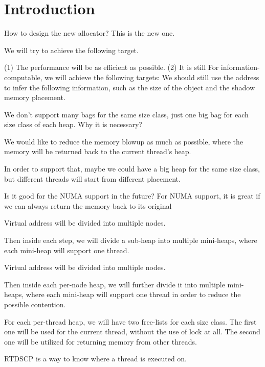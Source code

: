 
\section{Introduction}
\label{sec:intro}

How to design the new allocator? This is the new one. 

We will try to achieve the following target. 

(1) The performance will be as efficient as possible. 
(2) It is still 
For information-computable, we will achieve the following targets:
We should still use the address to infer the following information, such as the size of the object and the shadow memory placement.

We don't support many bags for the same size class, just one big bag for each size class of each heap. Why it is necessary? 

We would like to reduce the memory blowup as much as possible, where the memory will be returned back to the current thread's heap. 

In order to support that, maybe we could have a big heap for the same size class, but different threads will start from different placement. 

Is it good for the NUMA support in the future? For NUMA support, it is great if we can always return the memory back to its original 


Virtual address will be divided into multiple nodes. 

Then inside each step, we will divide a sub-heap into multiple mini-heaps, where each mini-heap will support one thread. 


Virtual address will be divided into multiple nodes. 

Then inside each per-node heap, we will further divide it into multiple mini-heaps, where each mini-heap will support one thread in order to reduce the possible contention. 

For each per-thread heap, we will have two free-lists for each size class. The first one will be used for the current thread, without the use of lock at all. The second one will be utilized for returning memory from other threads.  

RTDSCP is a way to know where a thread is executed on. 




